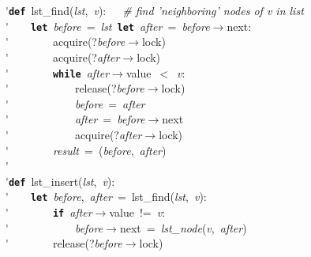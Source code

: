 \'\>\texttt{\textbf{def}}~lst\_find(\textit{lst},~\textit{v}):~~~\emph{\# find 'neighboring' nodes of v in list}\\

\'\>~~~~\texttt{\textbf{let}}~\textit{before}~=~\textit{lst}~\texttt{\textbf{let}}~\textit{after}~=~\textit{before}$\rightarrow$next:\\

\'\>~~~~~~~~acquire(?\textit{before}$\rightarrow$lock)\\

\'\>~~~~~~~~acquire(?\textit{after}$\rightarrow$lock)\\

\'\>~~~~~~~~\texttt{\textbf{while}}~\textit{after}$\rightarrow$value~$<$~\textit{v}:\\

\'\>~~~~~~~~~~~~release(?\textit{before}$\rightarrow$lock)\\

\'\>~~~~~~~~~~~~\textit{before}~=~\textit{after}\\

\'\>~~~~~~~~~~~~\textit{after}~=~\textit{before}$\rightarrow$next\\

\'\>~~~~~~~~~~~~acquire(?\textit{after}$\rightarrow$lock)\\

\'\>~~~~~~~~\textit{result}~=~(\textit{before},~\textit{after})\\

\'\>\\

\'\>\texttt{\textbf{def}}~lst\_insert(\textit{lst},~\textit{v}):\\

\'\>~~~~\texttt{\textbf{let}}~\textit{before},~\textit{after}~=~lst\_find(\textit{lst},~\textit{v}):\\

\'\>~~~~~~~~\texttt{\textbf{if}}~\textit{after}$\rightarrow$value~!=~\textit{v}:\\

\'\>~~~~~~~~~~~~\textit{before}$\rightarrow$next~=~\textit{lst\_node}(\textit{v},~\textit{after})\\

\'\>~~~~~~~~release(?\textit{before}$\rightarrow$lock)\\

